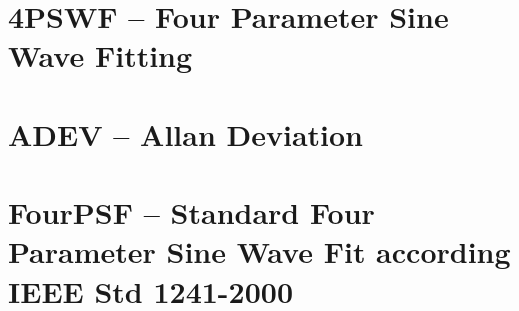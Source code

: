 \documentclass[12pt,a4paper,oneside]{report} %
\begin{document}
\chapter{4PSWF -- Four Parameter Sine Wave Fitting} %
\section*{\infosection} %

\section*{\examplesection} %


\chapter{ADEV -- Allan Deviation} %
\section*{\infosection} %

\section*{\examplesection} %


\chapter{FourPSF -- Standard Four Parameter Sine Wave Fit according IEEE Std 1241-2000} %
\section*{\infosection} %

\end{document}

